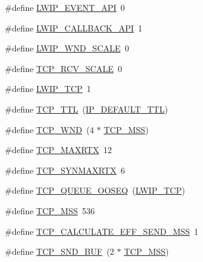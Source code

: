 \begin{DoxyCompactItemize}
\item 
\#define \hyperlink{group__lwip__opts__tcp_ga39f76e811117155be8525bb386ecddb7}{L\+W\+I\+P\+\_\+\+E\+V\+E\+N\+T\+\_\+\+A\+PI}~0
\item 
\#define \hyperlink{group__lwip__opts__tcp_ga2ca03bfa6f604ba536e38ccfdbdf9c8d}{L\+W\+I\+P\+\_\+\+C\+A\+L\+L\+B\+A\+C\+K\+\_\+\+A\+PI}~1
\item 
\#define \hyperlink{group__lwip__opts__tcp_ga88dbbfeeeb41b129fdc8235fc08bb530}{L\+W\+I\+P\+\_\+\+W\+N\+D\+\_\+\+S\+C\+A\+LE}~0
\item 
\#define \hyperlink{group__lwip__opts__tcp_ga768765a2c678fefeca6c89aae0cf629f}{T\+C\+P\+\_\+\+R\+C\+V\+\_\+\+S\+C\+A\+LE}~0
\item 
\#define \hyperlink{group__lwip__opts__tcp_gaa4ed98deb97b77c633cb8870f34c71e9}{L\+W\+I\+P\+\_\+\+T\+CP}~1
\item 
\#define \hyperlink{group__lwip__opts__tcp_gacd5b25ea81d2894790d25da5393cdab4}{T\+C\+P\+\_\+\+T\+TL}~(\hyperlink{group__lwip__opts__ipv4_ga556b9b58fd02c0fdd126791baef77411}{I\+P\+\_\+\+D\+E\+F\+A\+U\+L\+T\+\_\+\+T\+TL})
\item 
\#define \hyperlink{group__lwip__opts__tcp_ga7f535a6efb5cdf86c3210e35ece1d6a7}{T\+C\+P\+\_\+\+W\+ND}~(4 $\ast$ \hyperlink{group__lwip__opts__tcp_gaf1ab7bb27860aa3677c387a2f3ba317b}{T\+C\+P\+\_\+\+M\+SS})
\item 
\#define \hyperlink{group__lwip__opts__tcp_ga0dee0911197855bdf19ef79778c241a6}{T\+C\+P\+\_\+\+M\+A\+X\+R\+TX}~12
\item 
\#define \hyperlink{group__lwip__opts__tcp_ga50b434a8541a4813f7b27f576c05d1b6}{T\+C\+P\+\_\+\+S\+Y\+N\+M\+A\+X\+R\+TX}~6
\item 
\#define \hyperlink{group__lwip__opts__tcp_ga89ffd0d7d1529bdb26bfbad267d0ad75}{T\+C\+P\+\_\+\+Q\+U\+E\+U\+E\+\_\+\+O\+O\+S\+EQ}~(\hyperlink{group__lwip__opts__tcp_gaa4ed98deb97b77c633cb8870f34c71e9}{L\+W\+I\+P\+\_\+\+T\+CP})
\item 
\#define \hyperlink{group__lwip__opts__tcp_gaf1ab7bb27860aa3677c387a2f3ba317b}{T\+C\+P\+\_\+\+M\+SS}~536
\item 
\#define \hyperlink{group__lwip__opts__tcp_gac04b84d32251ac558f0c3a8af85ba3a5}{T\+C\+P\+\_\+\+C\+A\+L\+C\+U\+L\+A\+T\+E\+\_\+\+E\+F\+F\+\_\+\+S\+E\+N\+D\+\_\+\+M\+SS}~1
\item 
\#define \hyperlink{group__lwip__opts__tcp_ga871d111968d8c6c7880ff36b93c5c4dd}{T\+C\+P\+\_\+\+S\+N\+D\+\_\+\+B\+UF}~(2 $\ast$ \hyperlink{group__lwip__opts__tcp_gaf1ab7bb27860aa3677c387a2f3ba317b}{T\+C\+P\+\_\+\+M\+SS})

\end{DoxyCompactItemize}
